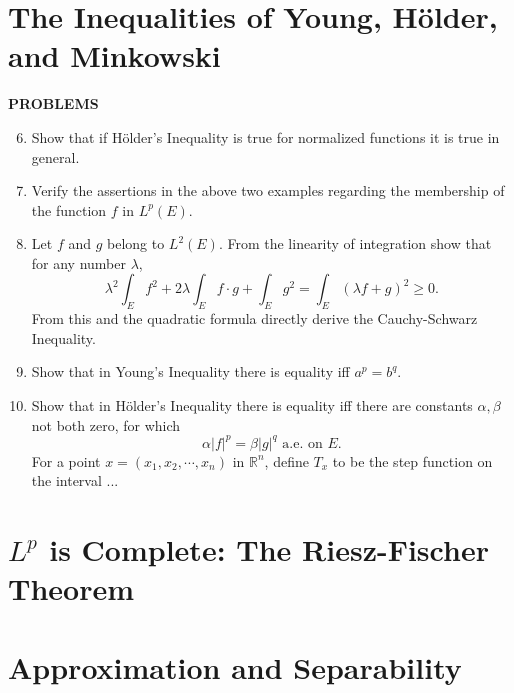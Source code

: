 \section{The Inequalities of Young, H\"older, and Minkowski}

\begin{center}
	\textbf{PROBLEMS}
\end{center}
\begin{enumerate}
	\setcounter{enumi}{5}
	\item Show that if H\"older's Inequality is true for normalized functions it is true in general.
	\item Verify the assertions in the above two examples regarding the membership of the function $f$ in $L^p(E)$. 
	\item Let $f$ and $g$ belong to $L^2(E)$. From the linearity of integration show that for any number $\lambda$,
	\[
		\lambda^2\int_Ef^2+2\lambda\int_Ef\cdot g+\int_Eg^2=\int_E(\lambda f+g)^2\ge0.	
	\] 
	From this and the quadratic formula directly derive the Cauchy-Schwarz Inequality.
	\item Show that in Young's Inequality there is equality iff $a^p=b^q$.
	\item Show that in H\"older's Inequality there is equality iff there are constants $\alpha,\beta$ not both zero, for which
	\[
		\alpha|f|^p=\beta|g|^q\text{ a.e. on }E.	
	\]
	For a point $x=(x_1,x_2,\cdots,x_n)$ in $\mathbb{R}^n$, define $T_x$ to be the step function on the interval ...
\end{enumerate}

\section{$L^p$ is Complete: The Riesz-Fischer Theorem}

\section{Approximation and Separability}

